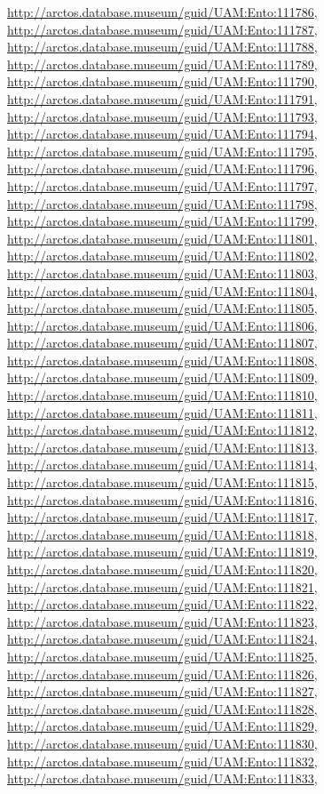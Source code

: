 \documentclass[9pt, article]{memoir}
\begin{document}
\begin{multicols}{2}
\url{http://arctos.database.museum/guid/UAM:Ento:111786}, 
\url{http://arctos.database.museum/guid/UAM:Ento:111787}, 
\url{http://arctos.database.museum/guid/UAM:Ento:111788}, 
\url{http://arctos.database.museum/guid/UAM:Ento:111789}, 
\url{http://arctos.database.museum/guid/UAM:Ento:111790}, 
\url{http://arctos.database.museum/guid/UAM:Ento:111791}, 
\url{http://arctos.database.museum/guid/UAM:Ento:111793}, 
\url{http://arctos.database.museum/guid/UAM:Ento:111794}, 
\url{http://arctos.database.museum/guid/UAM:Ento:111795}, 
\url{http://arctos.database.museum/guid/UAM:Ento:111796}, 
\url{http://arctos.database.museum/guid/UAM:Ento:111797}, 
\url{http://arctos.database.museum/guid/UAM:Ento:111798}, 
\url{http://arctos.database.museum/guid/UAM:Ento:111799}, 
\url{http://arctos.database.museum/guid/UAM:Ento:111801}, 
\url{http://arctos.database.museum/guid/UAM:Ento:111802}, 
\url{http://arctos.database.museum/guid/UAM:Ento:111803}, 
\url{http://arctos.database.museum/guid/UAM:Ento:111804}, 
\url{http://arctos.database.museum/guid/UAM:Ento:111805}, 
\url{http://arctos.database.museum/guid/UAM:Ento:111806}, 
\url{http://arctos.database.museum/guid/UAM:Ento:111807}, 
\url{http://arctos.database.museum/guid/UAM:Ento:111808}, 
\url{http://arctos.database.museum/guid/UAM:Ento:111809}, 
\url{http://arctos.database.museum/guid/UAM:Ento:111810}, 
\url{http://arctos.database.museum/guid/UAM:Ento:111811}, 
\url{http://arctos.database.museum/guid/UAM:Ento:111812}, 
\url{http://arctos.database.museum/guid/UAM:Ento:111813}, 
\url{http://arctos.database.museum/guid/UAM:Ento:111814}, 
\url{http://arctos.database.museum/guid/UAM:Ento:111815}, 
\url{http://arctos.database.museum/guid/UAM:Ento:111816}, 
\url{http://arctos.database.museum/guid/UAM:Ento:111817}, 
\url{http://arctos.database.museum/guid/UAM:Ento:111818}, 
\url{http://arctos.database.museum/guid/UAM:Ento:111819}, 
\url{http://arctos.database.museum/guid/UAM:Ento:111820}, 
\url{http://arctos.database.museum/guid/UAM:Ento:111821}, 
\url{http://arctos.database.museum/guid/UAM:Ento:111822}, 
\url{http://arctos.database.museum/guid/UAM:Ento:111823}, 
\url{http://arctos.database.museum/guid/UAM:Ento:111824}, 
\url{http://arctos.database.museum/guid/UAM:Ento:111825}, 
\url{http://arctos.database.museum/guid/UAM:Ento:111826}, 
\url{http://arctos.database.museum/guid/UAM:Ento:111827}, 
\url{http://arctos.database.museum/guid/UAM:Ento:111828}, 
\url{http://arctos.database.museum/guid/UAM:Ento:111829}, 
\url{http://arctos.database.museum/guid/UAM:Ento:111830}, 
\url{http://arctos.database.museum/guid/UAM:Ento:111832}, 
\url{http://arctos.database.museum/guid/UAM:Ento:111833}, 

\end{multicols}
\end{document}
